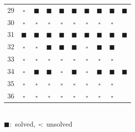 \begin{table}
\begin{tabular}{c | c | c | c | c | c | c | c | c | c}
		29 & $\square$ & $\blacksquare$ & $\blacksquare$ & $\blacksquare$ & $\blacksquare$ & $\blacksquare$ & $\blacksquare$ & $\blacksquare$ & $\blacksquare$ \\
		30 & $\square$ & $\square$ & $\square$ & $\square$ & $\square$ & $\square$ & $\square$ & $\square$ & \\
		31 & $\blacksquare$ & $\blacksquare$ & $\blacksquare$ & $\blacksquare$ & $\blacksquare$ & $\blacksquare$ & $\blacksquare$ & $\blacksquare$ & $\blacksquare$ \\
		32 & $\square$ & $\square$ & $\blacksquare$ & $\blacksquare$ & $\blacksquare$ & $\square$ & $\blacksquare$ & $\blacksquare$ &  \\ 
		33 & $\square$ & $\square$ & $\square$ & $\square$ & $\square$ & $\square$ & $\square$ & $\square$ & \\
		34 & $\square$ & $\blacksquare$ & $\blacksquare$ & $\square$ & $\blacksquare$ & $\square$ & $\blacksquare$ & $\blacksquare$ & $\blacksquare$ \\
		35 & $\square$ & $\square$ & $\square$ & $\square$ & $\square$ & $\square$ & $\square$ & $\square$ & \\
		36 & $\square$ & $\square$ & $\square$ & $\square$ & $\square$ & $\square$ & $\square$ & $\square$ & \\
		\hline
	\end{tabular}
	\\[.3em]
	\mbox{$\blacksquare$: solved, $\square$: unsolved}
\end{table}

